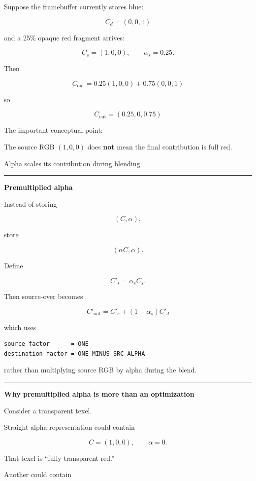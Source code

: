 Suppose the framebuffer currently stores blue:

\[
C_d=(0,0,1)
\]

and a 25\% opaque red fragment arrives:

\[
C_s=(1,0,0),\qquad \alpha_s=0.25.
\]

Then

\[
C_{\text{out}}
=
0.25(1,0,0)
+
0.75(0,0,1)
\]

so

\[
\boxed{
C_{\text{out}}
=
(0.25,0,0.75)
}
\]

The important conceptual point:

The source RGB \((1,0,0)\) does \textbf{not} mean the final contribution is full red.

Alpha scales its contribution during blending.

\begin{center}\rule{0.5\linewidth}{0.5pt}\end{center}

\textbf{Premultiplied alpha}

Instead of storing

\[
(C,\alpha),
\]

store

\[
(\alpha C,\alpha).
\]

Define

\[
C'_s=\alpha_s C_s.
\]

Then source-over becomes

\[
\boxed{
C'_{\text{out}}
=
C'_s+(1-\alpha_s)C'_d
}
\]

which uses

\begin{verbatim}
source factor      = ONE
destination factor = ONE_MINUS_SRC_ALPHA
\end{verbatim}

rather than multiplying source RGB by alpha during the blend.

\begin{center}\rule{0.5\linewidth}{0.5pt}\end{center}

\textbf{Why premultiplied alpha is more than an optimization}

Consider a transparent texel.

Straight-alpha representation could contain

\[
C=(1,0,0),\qquad \alpha=0.
\]

That texel is ``fully transparent red.''

Another could contain

